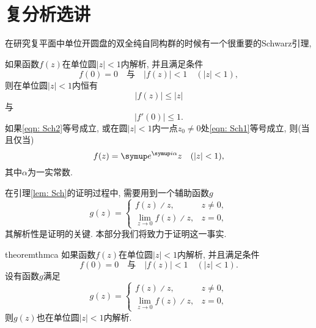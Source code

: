 \section{复分析选讲}

在研究复平面中单位开圆盘的双全纯自同构群的时候有一个很重要的Schwarz引理,

\begin{lemma}\label{lem: Sch}
    如果函数$f(z)$在单位圆$|z|<1$内解析, 并且满足条件
    \begin{equation}
        f(0)=0\quad\text{与}\quad |f(z)|<1\quad (|z|<1),
    \end{equation}
    则在单位圆$|z|<1$内恒有
    \begin{equation}\label{eqn: Sch1}
        |f(z)|\leq |z|
    \end{equation}
    与
    \begin{equation}\label{eqn: Sch2}
        |f'(0)|\leq 1.
    \end{equation}
    如果\ref{eqn: Sch2}等号成立, 或在圆$|z|<1$内一点$z_0\neq 0$处\ref{eqn: Sch1}等号成立, 则(当且仅当)
    \begin{equation}
        f(z)=\me^{\mi\alpha}z\quad (|z|<1),
    \end{equation}
    其中$\alpha$为一实常数.
\end{lemma}

在引理\ref{lem: Sch}的证明过程中, 需要用到一个辅助函数$g$
\begin{equation}
    g(z) =
    \begin{cases}
        f(z)\divslash z, &z\neq 0,\\
        \lim_{z\to 0} f(z)\divslash z, &z=0,
    \end{cases}
\end{equation}
其解析性是证明的关键. 本部分我们将致力于证明这一事实.

\begin{restatable*}{theorem}{thmca}
    如果函数$f(z)$在单位圆$|z|<1$内解析, 并且满足条件
    \begin{equation}
        f(0)=0\quad\text{与}\quad |f(z)|<1\quad (|z|<1).
    \end{equation}
    设有函数$g$满足
    \begin{equation}
        g(z) =
        \begin{cases}
            f(z)\divslash z, &z\neq 0,\\
            \lim_{z\to 0} f(z)\divslash z, &z=0,
        \end{cases}
    \end{equation}
    则$g(z)$也在单位圆$|z|<1$内解析.
\end{restatable*}

